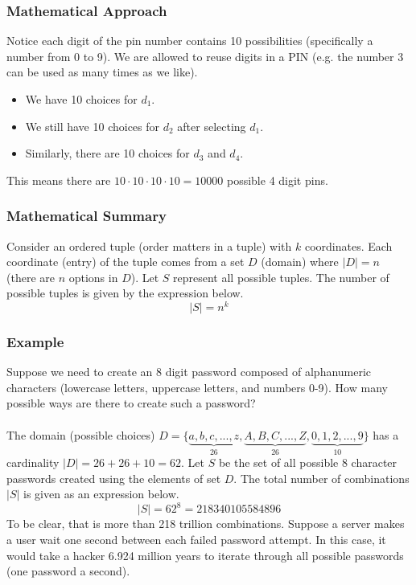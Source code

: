 \subsubsection*{Mathematical Approach}
Notice each digit of the pin number contains 10 possibilities (specifically a number from 0 to 9). We are allowed to reuse digits in a PIN (e.g. the number 3 can be used as many times as we like). 
\begin{itemize}
    \item We have 10 choices for $d_1$.
    \item We still have 10 choices for $d_2$ after selecting $d_1$.
    \item Similarly, there are 10 choices for $d_3$ and $d_4$.
\end{itemize}
This means there are $10 \cdot 10 \cdot 10 \cdot 10 = 10000$ possible 4 digit pins.
\subsubsection*{Mathematical Summary}
Consider an ordered tuple (order matters in a tuple) with $k$ coordinates. Each coordinate (entry) of the tuple comes from a set $D$ (domain) where $|D| = n$ (there are $n$ options in $D$). Let $S$ represent all possible tuples.  The number of possible tuples is given by the expression below. $$|S| = n^k$$

\subsubsection*{Example}
Suppose we need to create an 8 digit password composed of alphanumeric characters (lowercase letters, uppercase letters, and numbers 0-9). How many possible ways are there to create such a password?\\\\
The domain (possible choices) $D = \{\underbrace{a,b,c,...,z}_{26},\underbrace{A,B,C,...,Z}_{26}, \underbrace{0,1,2,...,9}_{10}\}$ has a cardinality $|D| = 26+26+10 = 62$.  Let $S$ be the set of all possible 8 character passwords created using the elements of set $D$.  The total number of combinations $|S|$ is given as an expression below. $$|S| = 62^8 = 218340105584896$$
To be clear, that is more than 218 trillion combinations.  Suppose a server makes a user wait one second between each failed password attempt.  In this case, it would take a hacker 6.924 million years to iterate through all possible passwords (one password a second).


